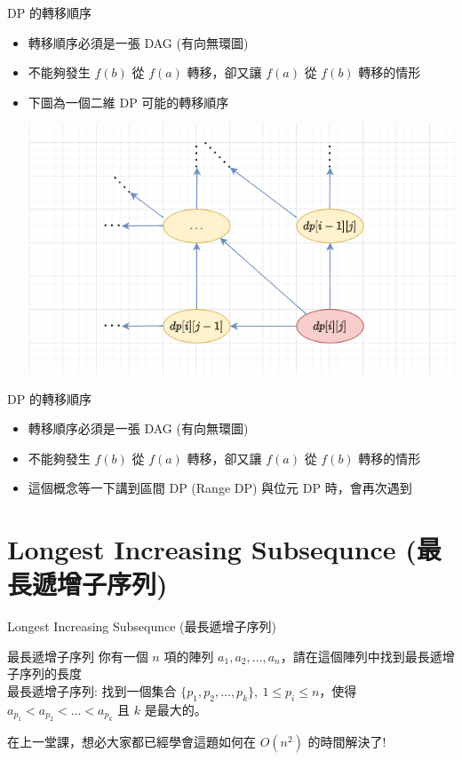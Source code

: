 \documentclass[aspectratio=169]{beamer}
\begin{document}
\begin{frame}{DP 的轉移順序}
    \begin{itemize}
        \item 轉移順序必須是一張 DAG (有向無環圖)
        \item 不能夠發生 $f(b)$ 從 $f(a)$ 轉移，卻又讓 $f(a)$ 從 $f(b)$ 轉移的情形
        \item 下圖為一個二維 DP 可能的轉移順序
        \begin{center}
            \includegraphics[scale=0.5]{images/DP_DAG_2D.png}
        \end{center}
    \end{itemize}
\end{frame}

\begin{frame}{DP 的轉移順序}
    \begin{itemize}
        \item 轉移順序必須是一張 DAG (有向無環圖)
        \item 不能夠發生 $f(b)$ 從 $f(a)$ 轉移，卻又讓 $f(a)$ 從 $f(b)$ 轉移的情形
        \item 這個概念等一下講到區間 DP (Range DP) 與位元 DP 時，會再次遇到
    \end{itemize}
\end{frame}

\section{Longest Increasing Subsequnce (最長遞增子序列)}

\begin{frame}{Longest Increasing Subsequnce (最長遞增子序列)}
    \begin{block}{最長遞增子序列}
        你有一個 $n$ 項的陣列 $a_1,a_2,\dots,a_n$，請在這個陣列中找到最長遞增子序列的長度 \\
        \vspace{5mm}
        最長遞增子序列: 找到一個集合 $\{p_1,p_2,\dots,p_k\}, \ 1 \le p_i \le n$，使得 $a_{p_1} < a_{p_2} < \dots < a_{p_k}$ 且 $k$ 是最大的。
    \end{block}
    在上一堂課，想必大家都已經學會這題如何在 $O(n^2)$ 的時間解決了!
\end{frame}
\end{document}
